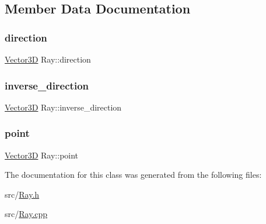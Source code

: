\subsection{Member Data Documentation}
\mbox{\label{classRay_afe8cae110601e8ece9edd45ba500c2d0}} 
\subsubsection{\texorpdfstring{direction}{direction}}
{\footnotesize\ttfamily \mbox{\hyperlink{classVector3D}{Vector3D}} Ray\+::direction\hspace{0.3cm}{\ttfamily [private]}}

\mbox{\label{classRay_a58bfdb8ab63bad3882999e5d2113a927}} 
\subsubsection{\texorpdfstring{inverse\_direction}{inverse\_direction}}
{\footnotesize\ttfamily \mbox{\hyperlink{classVector3D}{Vector3D}} Ray\+::inverse\+\_\+direction\hspace{0.3cm}{\ttfamily [private]}}

\mbox{\label{classRay_a35cd5ddd116f79b927e5ce1dfaca64c7}} 
\subsubsection{\texorpdfstring{point}{point}}
{\footnotesize\ttfamily \mbox{\hyperlink{classVector3D}{Vector3D}} Ray\+::point\hspace{0.3cm}{\ttfamily [private]}}



The documentation for this class was generated from the following files\+:\begin{DoxyCompactItemize}
\item 
src/\mbox{\hyperlink{Ray_8h}{Ray.\+h}}\item 
src/\mbox{\hyperlink{Ray_8cpp}{Ray.\+cpp}}\end{DoxyCompactItemize}
